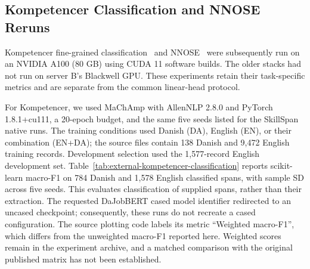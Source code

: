 \subsection{Kompetencer Classification and NNOSE Reruns}
Kompetencer fine-grained classification~\citep{jensen2022kompetencer} and NNOSE~\citep{zhang2024nnose} were subsequently run on an NVIDIA A100 (80 GB) using CUDA 11 software builds. The older stacks had not run on server B's Blackwell GPU. These experiments retain their task-specific metrics and are separate from the common linear-head protocol.

For Kompetencer, we used MaChAmp with AllenNLP 2.8.0 and PyTorch 1.8.1+cu111, a 20-epoch budget, and the same five seeds listed for the SkillSpan native runs. The training conditions used Danish (DA), English (EN), or their combination (EN+DA); the source files contain 138 Danish and 9,472 English training records. Development selection used the 1,577-record English development set. Table~\ref{tab:external-kompetencer-classification} reports scikit-learn macro-F1 on 784 Danish and 1,578 English classified spans, with sample SD across five seeds. This evaluates classification of supplied spans, rather than their extraction. The requested DaJobBERT cased model identifier redirected to an uncased checkpoint; consequently, these runs do not recreate a cased configuration. The source plotting code labels its metric ``Weighted macro-F1'', which differs from the unweighted macro-F1 reported here. Weighted scores remain in the experiment archive, and a matched comparison with the original published matrix has not been established.

